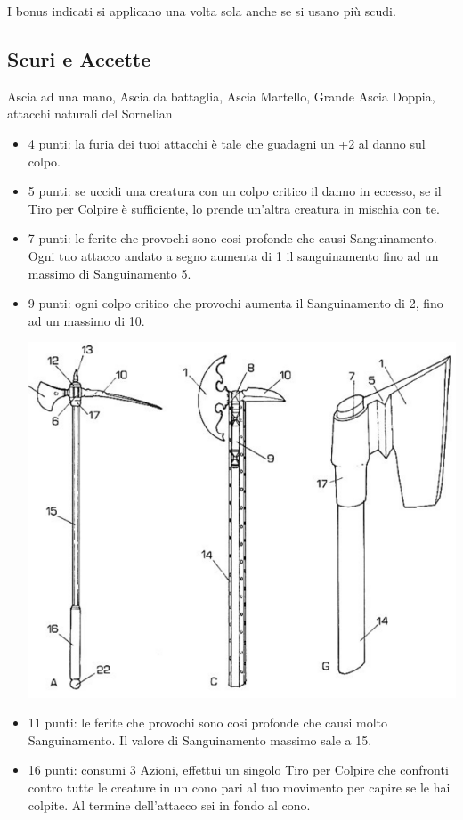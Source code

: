 \begin{multicols}{2}
\begin{itemize}[leftmargin=*]
I bonus indicati si applicano una volta sola anche se si usano più scudi.

\end{itemize}

\subsection{Scuri e Accette} Ascia ad una mano, Ascia da battaglia, Ascia Martello, Grande Ascia Doppia, attacchi naturali del Sornelian\label{listaasce}

\begin{itemize}[leftmargin=*] \setlength{\itemsep}{0pt}

\item 4 punti: la furia dei tuoi attacchi è tale che guadagni un +2 al danno sul colpo.
\item 5 punti: se uccidi una creatura con un colpo critico il danno in eccesso, se il Tiro per Colpire è sufficiente, lo prende un'altra creatura in mischia con te.
\item 7 punti: le ferite che provochi sono cosi profonde che causi Sanguinamento. Ogni tuo attacco andato a segno aumenta di 1 il sanguinamento fino ad un massimo di Sanguinamento 5.
\item 9 punti: ogni colpo critico che provochi aumenta il Sanguinamento di 2, fino ad un massimo di 10.

\smallskip

\begin{center}
	\includegraphics[width=0.7\linewidth]{immagini/scurieaccette.png}
\end{center}

\item 11 punti: le ferite che provochi sono cosi profonde che causi molto Sanguinamento. Il valore di Sanguinamento massimo sale a 15.
\item 16 punti: consumi 3 Azioni, effettui un singolo Tiro per Colpire che confronti contro tutte le creature in un cono pari al tuo movimento per capire se le hai colpite. Al termine dell'attacco sei in fondo al cono.


\end{itemize}
\end{multicols}
